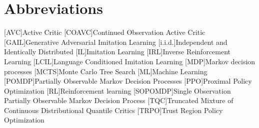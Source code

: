 
\chapter{Abbreviations}
\begin{acronym}
    [AVC]{Active Critic}
    [COAVC]{Continued Observation Active Critic}
    [GAIL]{Generative Adversarial Imitation Learning}
    [i.i.d.]{Independent and Identically Distributed}
    [IL]{Imitation Learning}
    [IRL]{Inverse Reinforcement Learning}
    [LCIL]{Language Conditioned Imitation Learning}
    [MDP]{Markov decision processes}
    [MCTS]{Monte Carlo Tree Search}
    [ML]{Machine Learning}
    [POMDP]{Partially Observable Markov Decision Processes}
    [PPO]{Proximal Policy Optimization}
    [RL]{Reinforcement learning}
    [SOPOMDP]{Single Observation Partially Observable Markov Decision Process}
    [TQC]{Truncated Mixture of Continuous Distributional Quantile Critics}
    [TRPO]{Trust Region Policy Optimization}
\end{acronym}
